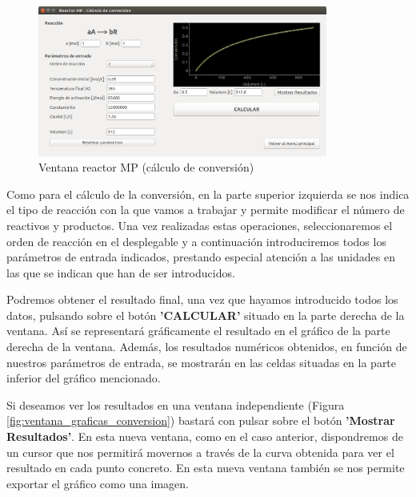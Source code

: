 \begin{figure}[h!]
	\begin{center}
		\includegraphics[width=0.85\textwidth]{./imagenes/reactor_fp/mezcla_perfecta3.png}\caption{Ventana reactor MP (cálculo de conversión)}\label{fig:ventana_conversion}
	\end{center}
\end{figure}

Como para el cálculo de la conversión, en la parte superior izquierda se nos indica el tipo de reacción con la que vamos a trabajar y permite modificar el número de reactivos y productos. Una vez realizadas estas operaciones, seleccionaremos el orden de reacción en el desplegable y a continuación introduciremos todos los parámetros de entrada indicados, prestando especial atención a las unidades en las que se indican que han de ser introducidos.

Podremos obtener el resultado final, una vez que hayamos introducido todos los datos, pulsando sobre el botón \textbf{'CALCULAR'} situado en la parte derecha de la ventana. Así se representará gráficamente el resultado en el gráfico de la parte derecha de la ventana. Además, los resultados numéricos obtenidos, en función de nuestros parámetros de entrada, se mostrarán en las celdas situadas en la parte inferior del gráfico mencionado.

Si deseamos ver los resultados en una ventana independiente (Figura \ref{fig:ventana_graficas_conversion}) bastará con pulsar sobre el botón \textbf{'Mostrar Resultados'}. En esta nueva ventana, como en el caso anterior, dispondremos de un cursor que nos permitirá movernos a través de la curva obtenida para ver el resultado en cada punto concreto. En esta nueva ventana también se nos permite exportar el gráfico como una imagen.

